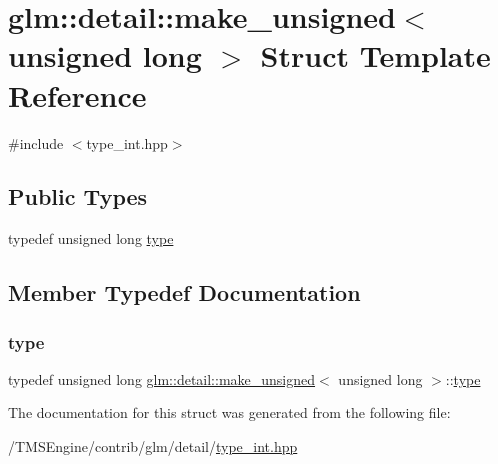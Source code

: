 \hypertarget{structglm_1_1detail_1_1make__unsigned_3_01unsigned_01long_01_4}{}\section{glm\+:\+:detail\+:\+:make\+\_\+unsigned$<$ unsigned long $>$ Struct Template Reference}
\label{structglm_1_1detail_1_1make__unsigned_3_01unsigned_01long_01_4}


{\ttfamily \#include $<$type\+\_\+int.\+hpp$>$}

\subsection*{Public Types}
\begin{DoxyCompactItemize}
\item 
typedef unsigned long \hyperlink{structglm_1_1detail_1_1make__unsigned_3_01unsigned_01long_01_4_a8894ccd179135bda131b42cf10e58362}{type}
\end{DoxyCompactItemize}


\subsection{Member Typedef Documentation}
\mbox{\label{structglm_1_1detail_1_1make__unsigned_3_01unsigned_01long_01_4_a8894ccd179135bda131b42cf10e58362}} 
\subsubsection{\texorpdfstring{type}{type}}
{\footnotesize\ttfamily typedef unsigned long \hyperlink{structglm_1_1detail_1_1make__unsigned}{glm\+::detail\+::make\+\_\+unsigned}$<$ unsigned long $>$\+::\hyperlink{structglm_1_1detail_1_1make__unsigned_3_01unsigned_01long_01_4_a8894ccd179135bda131b42cf10e58362}{type}}



The documentation for this struct was generated from the following file\+:\begin{DoxyCompactItemize}
\item 
/\+T\+M\+S\+Engine/contrib/glm/detail/\hyperlink{type__int_8hpp}{type\+\_\+int.\+hpp}\end{DoxyCompactItemize}

